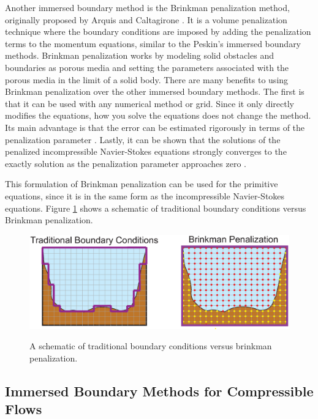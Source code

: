 Another immersed boundary method is the Brinkman penalization method, originally proposed by Arquis and Caltagirone \cite{84AC}.  It is a volume penalization technique where the boundary conditions are imposed by adding the penalization terms to the momentum equations, similar to the Peskin's immersed boundary methods.  Brinkman penalization works by modeling solid obstacles and boundaries as porous media and setting the parameters associated with the porous media in the limit of a solid body.  There are many benefits to using Brinkman penalization over the other immersed boundary methods.  The first is that it can be used with any numerical method or grid.  Since it only directly modifies the equations, how you solve the equations does not change the method.  Its main advantage is that the error can be estimated rigorously in terms of the penalization parameter \cite{99ABF}.  Lastly, it can be shown that the solutions of the penalized incompressible Navier-Stokes equations strongly converges to the exactly solution as the penalization parameter approaches zero \cite{99Angot}.    

This formulation of Brinkman penalization can be used for the primitive equations, since it is in the same form as the incompressible Navier-Stokes equations.  Figure \ref{f:bpdiagram} shows a schematic of traditional boundary conditions versus Brinkman penalization.

\begin{center}
\begin{figure}[h!]
\centering
  \includegraphics[width=5in]{Images/bpdiagram}\\
  \caption[Traditional boundaries vs. Brinkman penalization]{A schematic of traditional boundary conditions versus brinkman penalization.}\label{f:bpdiagram}
\end{figure}
\end{center}

\subsection{Immersed Boundary Methods for Compressible Flows}


